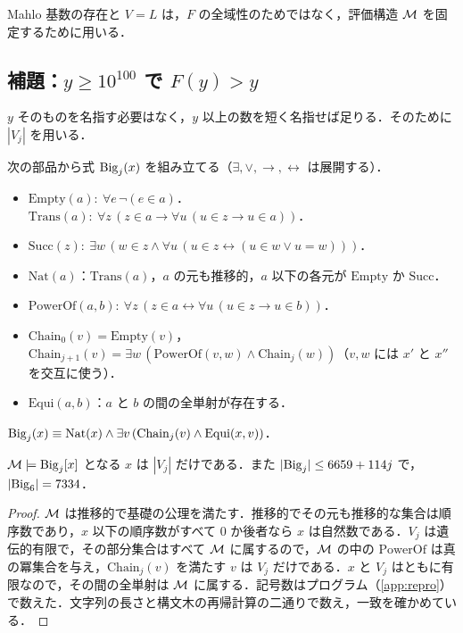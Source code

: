 Mahlo 基数の存在と $V{=}L$ は，$F$ の全域性のためではなく，評価構造 $\mathcal{M}$ を固定するために用いる．

\subsection{補題：$y\ge 10^{100}$ で $F(y)>y$}
$y$ そのものを名指す必要はなく，$y$ 以上の数を短く名指せば足りる．そのために $|V_j|$ を用いる．

\begin{definition}
次の部品から式 $\mathrm{Big}_j(x)$ を組み立てる（$\exists,\vee,\to,\leftrightarrow$ は展開する）．
\begin{itemize}
\item $\mathrm{Empty}(a):\ \forall e\,\neg(e\in a)$．$\mathrm{Trans}(a):\ \forall z\,(z\in a\to\forall u\,(u\in z\to u\in a))$．
\item $\mathrm{Succ}(z):\ \exists w\,(w\in z\wedge\forall u\,(u\in z\leftrightarrow(u\in w\vee u=w)))$．
\item $\mathrm{Nat}(a)$：$\mathrm{Trans}(a)$，$a$ の元も推移的，$a$ 以下の各元が $\mathrm{Empty}$ か $\mathrm{Succ}$．
\item $\mathrm{PowerOf}(a,b):\ \forall z\,(z\in a\leftrightarrow\forall u\,(u\in z\to u\in b))$．
\item $\mathrm{Chain}_0(v)=\mathrm{Empty}(v)$，$\mathrm{Chain}_{j+1}(v)=\exists w\,(\mathrm{PowerOf}(v,w)\wedge\mathrm{Chain}_j(w))$（$v,w$ には $x'$ と $x''$ を交互に使う）．
\item $\mathrm{Equi}(a,b)$：$a$ と $b$ の間の全単射が存在する．
\end{itemize}
$\mathrm{Big}_j(x)\equiv \mathrm{Nat}(x)\wedge\exists v\,(\mathrm{Chain}_j(v)\wedge\mathrm{Equi}(x,v))$．
\end{definition}

\begin{lemma}\label{lem:big}
$\mathcal{M}\models\mathrm{Big}_j[x]$ となる $x$ は $|V_j|$ だけである．また $|\mathrm{Big}_j|\le 6659+114j$ で，$|\mathrm{Big}_6|=7334$．
\end{lemma}
\begin{proof}
$\mathcal{M}$ は推移的で基礎の公理を満たす．推移的でその元も推移的な集合は順序数であり，$x$ 以下の順序数がすべて $0$ か後者なら $x$ は自然数である．$V_j$ は遺伝的有限で，その部分集合はすべて $\mathcal{M}$ に属するので，$\mathcal{M}$ の中の $\mathrm{PowerOf}$ は真の冪集合を与え，$\mathrm{Chain}_j(v)$ を満たす $v$ は $V_j$ だけである．$x$ と $V_j$ はともに有限なので，その間の全単射は $\mathcal{M}$ に属する．記号数はプログラム（\ref{app:repro}）で数えた．文字列の長さと構文木の再帰計算の二通りで数え，一致を確かめている．
\end{proof}

